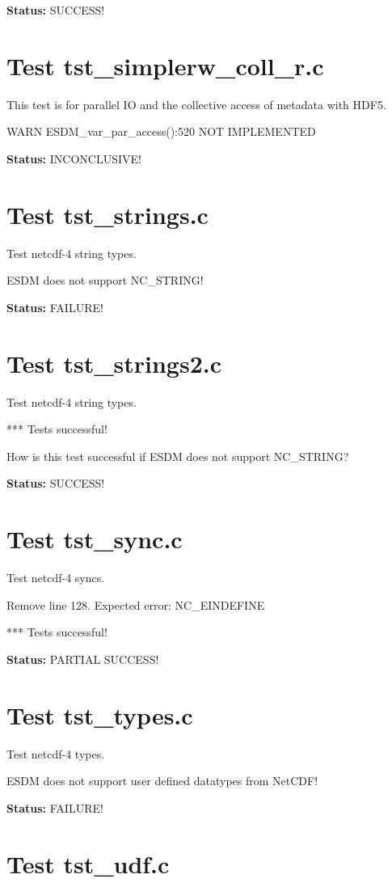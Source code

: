 {\bf \large Status: } SUCCESS!

\section{Test tst\_simplerw\_coll\_r.c}

This test is for parallel IO and the collective access of metadata with HDF5.

WARN ESDM\_var\_par\_access():520 NOT IMPLEMENTED

{\bf \large Status: } INCONCLUSIVE!

\section{Test tst\_strings.c}

Test netcdf-4 string types.

ESDM does not support NC\_STRING!

{\bf \large Status: } FAILURE!

\section{Test tst\_strings2.c}

Test netcdf-4 string types.

*** Tests successful!

How is this test successful if ESDM does not support NC\_STRING?

{\bf \large Status: } SUCCESS!

\section{Test tst\_sync.c}

Test netcdf-4 syncs.

Remove line 128. Expected error: NC\_EINDEFINE

*** Tests successful!

{\bf \large Status: } PARTIAL SUCCESS!

\section{Test tst\_types.c}

Test netcdf-4 types.

ESDM does not support user defined datatypes from NetCDF!

{\bf \large Status: } FAILURE!

\section{Test tst\_udf.c}

